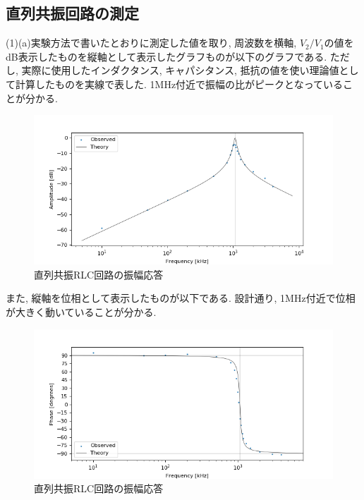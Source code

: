 \documentclass[a4j,dvipdfmx]{article}
\begin{document}
\subsection{直列共振回路の測定}
(1)(a)実験方法で書いたとおりに測定した値を取り, 周波数を横軸, $V_2/V_1$の値をdB表示したものを縦軸として表示したグラフものが以下のグラフである. ただし, 実際に使用したインダクタンス, キャパシタンス, 抵抗の値を使い理論値として計算したものを実線で表した. 1MHz付近で振幅の比がピークとなっていることが分かる. 
\begin{figure}[H]
    \begin{center}
     	\includegraphics[width=12cm]{figures/series_resonant_RLC_amp.png}
        \caption{直列共振RLC回路の振幅応答}
    \end{center}
\end{figure}

また, 縦軸を位相として表示したものが以下である. 設計通り, 1MHz付近で位相が大きく動いていることが分かる. 
\begin{figure}[H]
    \begin{center}
     	\includegraphics[width=12cm]{figures/series_resonant_RLC_phase.png}
        \caption{直列共振RLC回路の振幅応答}
    \end{center}
\end{figure}
\end{document}
